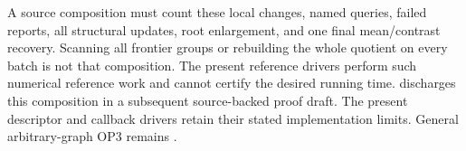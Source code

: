A source composition must count these local changes, named queries,
failed reports, all structural updates, root enlargement, and one final
mean/contrast recovery. Scanning all frontier groups or rebuilding the
whole quotient on every batch is not that composition. The present
reference drivers perform such numerical reference work and cannot
certify the desired running time.  discharges this composition in a
subsequent source-backed proof draft. The present descriptor and callback
drivers retain their stated implementation limits. General arbitrary-graph
OP3 remains \statusopen.
